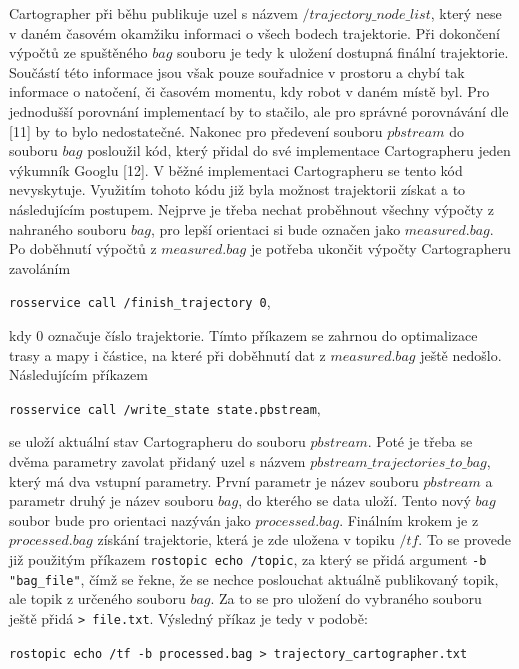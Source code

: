 \documentclass[12pt]{report}
\begin{document}
Cartographer při běhu publikuje uzel s názvem $/trajectory\_node\_list$, který nese v daném časovém okamžiku informaci o všech bodech trajektorie. Při dokončení výpočtů ze spuštěného $bag$ souboru je tedy k uložení dostupná finální trajektorie. Součástí této informace jsou však pouze souřadnice v prostoru a chybí tak informace o natočení, či časovém momentu, kdy robot v daném místě byl. Pro jednodušší porovnání implementací by to stačilo, ale pro správné porovnávání dle [11] by to bylo nedostatečné. Nakonec pro předevení souboru $pbstream$ do souboru $bag$ posloužil kód, který přidal do své implementace Cartographeru jeden výkumník Googlu [12]. V běžné implementaci Cartographeru se tento kód nevyskytuje. Využitím tohoto kódu již byla možnost trajektorii získat a to následujícím postupem. Nejprve je třeba nechat proběhnout všechny výpočty z nahraného souboru $bag$, pro lepší orientaci si bude označen jako $measured.bag$. Po doběhnutí výpočtů z $measured.bag$ je potřeba ukončit výpočty Cartographeru zavoláním
\begin{center}
	\texttt{rosservice call /finish\_trajectory 0},
\end{center}
kdy $0$ označuje číslo trajektorie. Tímto příkazem se zahrnou do optimalizace trasy a mapy i částice, na které při doběhnutí dat z $measured.bag$ ještě nedošlo. Následujícím příkazem
\begin{center}
	\texttt{rosservice call /write\_state state.pbstream},
\end{center} 
se uloží aktuální stav Cartographeru do souboru $pbstream$. Poté je třeba se dvěma parametry zavolat přidaný uzel s názvem $pbstream\_trajectories\_to\_bag$, který má dva vstupní parametry. První parametr je název souboru $pbstream$ a parametr druhý je název souboru $bag$, do kterého se data uloží. Tento nový $bag$ soubor bude pro orientaci nazýván jako $processed.bag$. Finálním krokem je z $processed.bag$ získání trajektorie, která je zde uložena v topiku $/tf$. To se provede již použitým příkazem \texttt{rostopic echo /topic}, za který se přidá argument \texttt{-b "bag\_file"}, čímž se řekne, že se nechce poslouchat aktuálně publikovaný topik, ale topik z určeného souboru $bag$. Za to se pro uložení do vybraného souboru ještě přidá \texttt{> file.txt}. Výsledný příkaz je tedy v podobě:
\begin{center}
	\texttt{rostopic echo /tf -b processed.bag > trajectory\_cartographer.txt}
\end{center}
\end{document}
